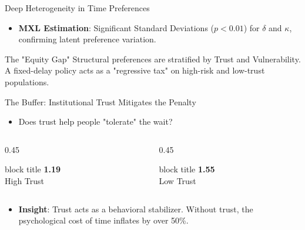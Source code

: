 \documentclass[10pt]{beamer}
\begin{document}
\begin{frame}{Deep Heterogeneity in Time Preferences}
    \begin{itemize}
        \item \textbf{MXL Estimation}: Significant Standard Deviations ($p<0.01$) for $\delta$ and $\kappa$, confirming \alert{latent preference variation}.
    \end{itemize}
    
    

    \vfill
    \begin{exampleblock}{The "Equity Gap"}
        \small Structural preferences are stratified by \alert{Trust} and \alert{Vulnerability}. A fixed-delay policy acts as a "regressive tax" on high-risk and low-trust populations.
    \end{exampleblock}
\end{frame}

\begin{frame}{The Buffer: Institutional Trust Mitigates the Penalty}
    \begin{itemize}
        \item Does trust help people "tolerate" the wait?
    \end{itemize}
    \vspace{0.4cm}
    \begin{columns}[T]
        \begin{column}{0.45\textwidth}
            \begin{beamercolorbox}[sep=0.8em, wd=\linewidth, center]{block title}
                \Large \textbf{1.19} \\ \small High Trust
            \end{beamercolorbox}
        \end{column}
        \begin{column}{0.45\textwidth}

        \begin{beamercolorbox}[sep=0.8em, wd=\linewidth, center]{block title}
                \Large \alert{\textbf{1.55}} \\ \small Low Trust
            \end{beamercolorbox}
        \end{column}
    \end{columns}
    \vfill
    \begin{itemize}
        \item \textbf{Insight}: Trust acts as a \alert{behavioral stabilizer}. Without trust, the psychological cost of time inflates by over 50\%.
    \end{itemize}
\end{frame}
\end{document}
